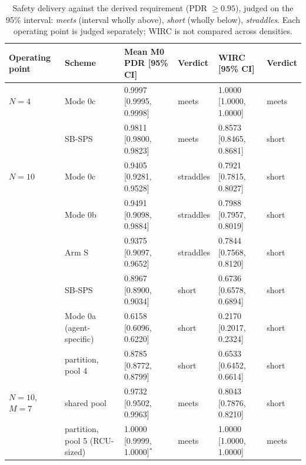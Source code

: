 \begin{table}[t]
\centering
\caption{Safety delivery against the derived requirement (PDR $\geq 0.95$), judged on the 95\% interval: \textit{meets} (interval wholly above), \textit{short} (wholly below), \textit{straddles}. Each operating point is judged separately; WIRC is not compared across densities.}
\label{tab:requirement}
\footnotesize
\begin{tabular}{llllll}
\toprule
Operating point & Scheme & Mean M0 PDR [95\% CI] & Verdict & WIRC [95\% CI] & Verdict \\
\midrule
$N = 4$ & Mode 0c & 0.9997 [0.9995, 0.9998] & meets & 1.0000 [1.0000, 1.0000] & meets \\
 & SB-SPS & 0.9811 [0.9800, 0.9823] & meets & 0.8573 [0.8465, 0.8681] & short \\
$N = 10$ & Mode 0c & 0.9405 [0.9281, 0.9528] & straddles & 0.7921 [0.7815, 0.8027] & short \\
 & Mode 0b & 0.9491 [0.9098, 0.9884] & straddles & 0.7988 [0.7957, 0.8019] & short \\
 & Arm S & 0.9375 [0.9097, 0.9652] & straddles & 0.7844 [0.7568, 0.8120] & short \\
 & SB-SPS & 0.8967 [0.8900, 0.9034] & short & 0.6736 [0.6578, 0.6894] & short \\
 & Mode 0a (agent-specific) & 0.6158 [0.6096, 0.6220] & short & 0.2170 [0.2017, 0.2324] & short \\
 & partition, pool 4 & 0.8785 [0.8772, 0.8799] & short & 0.6533 [0.6452, 0.6614] & short \\
$N = 10$, $M = 7$ & shared pool & 0.9732 [0.9502, 0.9963] & meets & 0.8043 [0.7876, 0.8210] & short \\
 & partition, pool 5 (RCU-sized) & 1.0000 [0.9999, 1.0000]$^{*}$ & meets & 1.0000 [1.0000, 1.0000] & meets \\
\bottomrule
\end{tabular}
\end{table}
